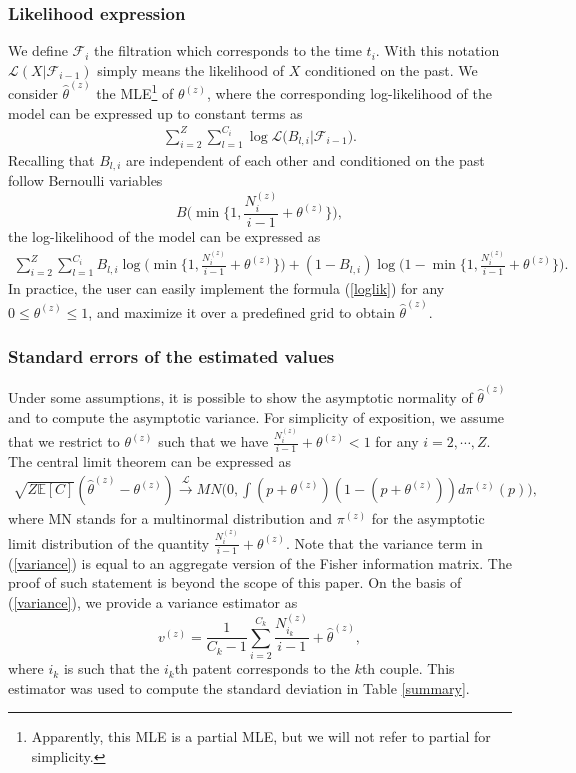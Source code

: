 \documentclass[12pt,twoside,a4paper]{article}
\begin{document}
\subsubsection*{Likelihood expression}
We define $\mathcal{F}_i$ the filtration which corresponds to the time $t_i$. With this notation $\mathcal{L}( X | \mathcal{F}_{i-1})$ simply means the likelihood of $X$ conditioned on the past. We consider $\widehat{\theta}^{(z)}$ the MLE\footnote{Apparently, this MLE is a partial MLE, but we will not refer to partial for simplicity.} of $\theta^{(z)}$, where the corresponding log-likelihood of the model can be expressed up to constant terms as
\begin{eqnarray*}
\sum_{i=2}^Z \sum_{l=1}^{C_i} \log \mathcal{L} \big( B_{l,i} | \mathcal{F}_{i-1} \big).
\end{eqnarray*}
Recalling that $B_{l,i}$ are independent of each other and conditioned on the past follow Bernoulli variables 
$$B \Big( \min \Big\{ 1, \frac{N_{i}^{(z)}}{i-1} + \theta^{(z)} \Big\} \Big),$$ 
the log-likelihood of the model can be expressed as 
\begin{eqnarray}
\label{loglik}
\sum_{i=2}^Z \sum_{l=1}^{C_i} B_{l,i} \log \Big( \min \Big\{ 1, \frac{N_{i}^{(z)}}{i-1} + \theta^{(z)} \Big\} \Big) +(1 - B_{l,i}) \log \Big(1 - \min \Big\{ 1, \frac{N_{i}^{(z)}}{i-1} + \theta^{(z)} \Big\} \Big).
\end{eqnarray}
In practice, the user can easily implement the formula (\ref{loglik}) for any $0 \leq \theta^{(z)} \leq 1$, and maximize it over a predefined grid to obtain $\widehat{\theta}^{(z)}$.

\subsubsection*{Standard errors of the estimated values}
Under some assumptions, it is possible to show the asymptotic normality of $\widehat{\theta}^{(z)}$ and to compute the asymptotic variance. For simplicity of exposition, we assume that we restrict to $\theta^{(z)}$ such that we have $\frac{N_{i}^{(z)}}{i-1} + \theta^{(z)} < 1$ for any $i=2, \cdots, Z$. The central limit theorem can be expressed as 
\begin{eqnarray}
\label{variance}
\sqrt{Z \mathbb{E} [ C ]} (\widehat{\theta}^{(z)} - \theta^{(z)}) \overset{\mathcal{L}}{\rightarrow} MN \Big( 0, \int (p + \theta^{(z)})(1 - (p + \theta^{(z)})) d\pi^{(z)} (p) \Big),
\end{eqnarray}
where MN stands for a multinormal distribution and $\pi^{(z)}$ for the asymptotic limit distribution of the quantity $\frac{N_{i}^{(z)}}{i-1} + \theta^{(z)}$. Note that the variance term in (\ref{variance}) is equal to an aggregate version of the Fisher information matrix. The proof of such statement is beyond the scope of this paper. On the basis of (\ref{variance}), we provide a variance estimator as 
$$v^{(z)} = \frac{1}{C_k-1}\sum_{i=2}^{C_k}  \frac{N_{i_k}^{(z)}}{i-1} + \widehat{\theta}^{(z)},$$ 
where $i_k$ is such that the $i_k$th patent corresponds to the $k$th couple. This estimator was used to compute the standard deviation in Table \ref{summary}.
\end{document}
